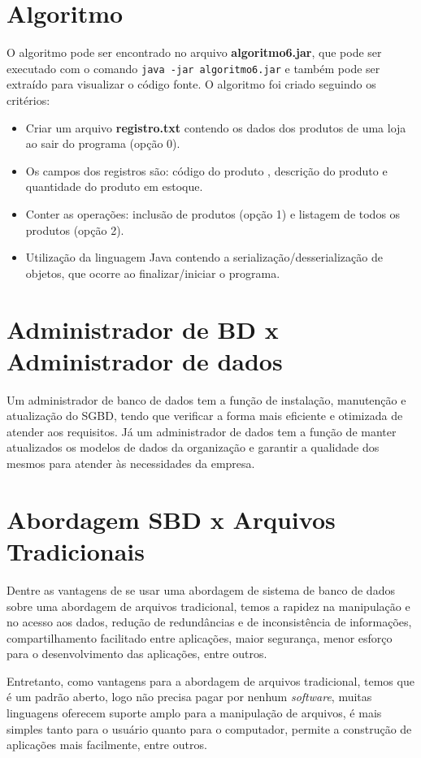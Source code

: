 \documentclass[12pt]{article}
\begin{document}
\section{Algoritmo}
O algoritmo pode ser encontrado no arquivo \textbf{algoritmo6.jar}, que pode ser executado com o comando \texttt{java -jar algoritmo6.jar} e também pode ser extraído para visualizar o código fonte.
O algoritmo foi criado seguindo os critérios:
\begin{itemize}
    \item Criar um arquivo \textbf{registro.txt} contendo os dados dos produtos de uma loja ao sair do programa (opção 0).
    \item Os campos dos registros são: código do produto , descrição do produto e quantidade do produto em estoque.
    \item Conter as operações: inclusão de produtos (opção 1) e listagem de todos os produtos (opção 2).
    \item Utilização da linguagem Java contendo a serialização/desserialização de objetos, que ocorre ao finalizar/iniciar o programa.
\end{itemize}

\section{Administrador de BD x Administrador de dados}
Um administrador de banco de dados tem a função de instalação, manutenção e atualização do SGBD, tendo que verificar a forma mais eficiente e otimizada de atender aos requisitos.
Já um administrador de dados tem a função de manter atualizados os modelos de dados da organização e garantir a qualidade dos mesmos para atender às necessidades da empresa.

\section{Abordagem SBD x Arquivos Tradicionais}
Dentre as vantagens de se usar uma abordagem de sistema de banco de dados sobre uma abordagem de arquivos tradicional, temos a rapidez na manipulação e no acesso aos dados, redução de redundâncias e de inconsistência de informações, compartilhamento facilitado entre aplicações, maior segurança, menor esforço para o desenvolvimento das aplicações, entre outros.

Entretanto, como vantagens para a abordagem de arquivos tradicional, temos que é um padrão aberto, logo não precisa pagar por nenhum \textit{software}, muitas linguagens oferecem suporte amplo para a manipulação de arquivos, é mais simples tanto para o usuário quanto para o computador, permite a construção de aplicações mais facilmente, entre outros.
\end{document}
